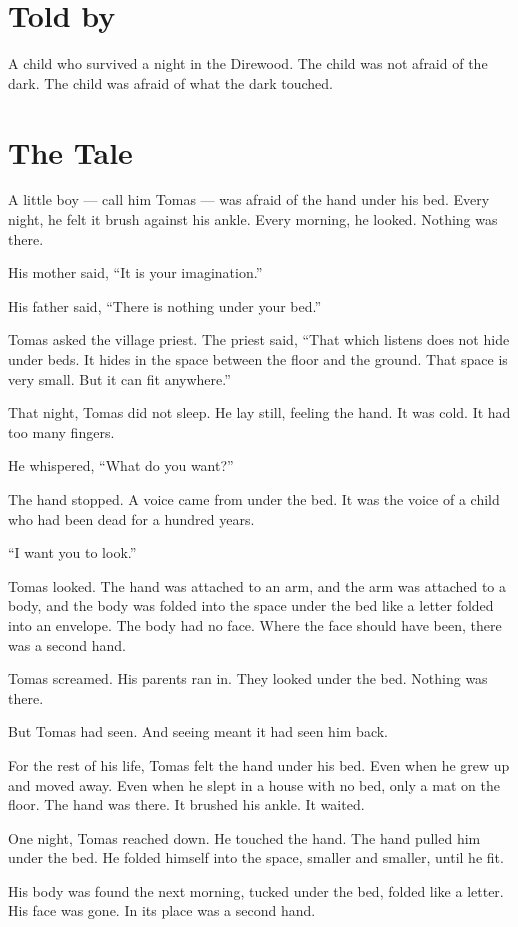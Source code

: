 \documentclass[10pt,twoside]{book}
\begin{document}
\section*{Told by}
A child who survived a night in the Direwood. The child was not afraid of the dark. The child was afraid of what the dark touched.

\section*{The Tale}
A little boy --- call him Tomas --- was afraid of the hand under his bed. Every night, he felt it brush against his ankle. Every morning, he looked. Nothing was there.

His mother said, ``It is your imagination.''

His father said, ``There is nothing under your bed.''

Tomas asked the village priest. The priest said, ``That which listens does not hide under beds. It hides in the space between the floor and the ground. That space is very small. But it can fit anywhere.''

That night, Tomas did not sleep. He lay still, feeling the hand. It was cold. It had too many fingers.

He whispered, ``What do you want?''

The hand stopped. A voice came from under the bed. It was the voice of a child who had been dead for a hundred years.

``I want you to look.''

Tomas looked. The hand was attached to an arm, and the arm was attached to a body, and the body was folded into the space under the bed like a letter folded into an envelope. The body had no face. Where the face should have been, there was a second hand.

Tomas screamed. His parents ran in. They looked under the bed. Nothing was there.

But Tomas had seen. And seeing meant it had seen him back.

For the rest of his life, Tomas felt the hand under his bed. Even when he grew up and moved away. Even when he slept in a house with no bed, only a mat on the floor. The hand was there. It brushed his ankle. It waited.

One night, Tomas reached down. He touched the hand. The hand pulled him under the bed. He folded himself into the space, smaller and smaller, until he fit.

His body was found the next morning, tucked under the bed, folded like a letter. His face was gone. In its place was a second hand.
\end{document}
